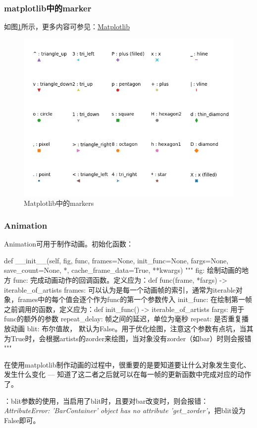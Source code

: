 \subsubsection{matplotlib中的marker}如图\ref{fig:matplotlib-markers}所示，更多内容可参见：\href{https://matplotlib.org/api/_as_gen/matplotlib.pyplot.plot.html#matplotlib.pyplot.plot}{Matplotlib}
\begin{figure}[h]
	\centering
	\includegraphics[width=.65\textwidth]{pics/markers.png}
	\caption{Matplotlib中的markers}
	\label{fig:matplotlib-markers}
\end{figure}

\subsubsection{Animation}
Animation可用于制作动画。初始化函数：
\begin{python}
	def __init__(self, fig, func, frames=None, init_func=None, fargs=None,
	save_count=None, *, cache_frame_data=True, **kwargs)
	"""
	fig: 绘制动画的地方
	func: 完成动画动作的回调函数。定义应为：def func(frame, *fargs) -> iterable_of_artists
	frames: 可以认为是每一个动画帧的索引，通常为iterable对象，frames中的每个值会逐个作为func的第一个参数传入
	init_func: 在绘制第一帧之前调用的函数，定义应为：def init_func() -> iterable_of_artists
	fargs: 用于func的额外的参数
	repeat_delay: 帧之间的延迟，单位为毫秒
	repeat: 是否重复播放动画
	blit: 布尔值故， 默认为False。用于优化绘图，注意这个参数有点坑，当其为True时，会根据artists的zorder来绘图，当对象没有zorder（如bar）时则会报错
	"""
\end{python}
在使用matplotlib制作动画的过程中，很重要的是要知道要让什么对象发生变化、发生什么变化 --- 知道了这二者之后就可以在每一帧的更新函数中完成对应的动作了。

：blit参数的使用，当启用了blit时，且要对bar改变时，则会报错：\textit{AttributeError: 'BarContainer' object has no attribute 'get\_zorder'}，把blit设为False即可。


